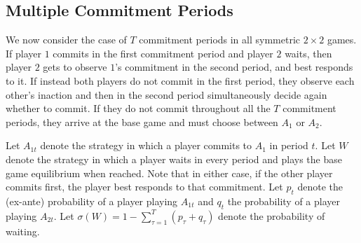 \documentclass[letterpaper]{article}
\newtheorem{corollary}{Corollary}
\theoremstyle{definition}
\begin{document}

\subsection{Multiple Commitment Periods}\label{sec:multiple-commitment-periods}
We now consider the case of $T$ commitment periods in all symmetric $2\times2$ games. If player $1$ commits in the first commitment period and player $2$ waits, then player $2$ gets to observe $1$'s commitment in the second period, and best responds to it.
If instead both players do not commit in the first period, they observe each other's inaction and then in the second period simultaneously decide again whether to commit. If they do not commit throughout all the $T$ commitment periods, they arrive at the base game and must choose between $A_1$ or $A_2$.

Let $A_{1t}$ denote the strategy in which a player commits to $A_1$ in period $t$. Let $W$ denote the strategy in which a player waits in every period and plays the base game equilibrium when reached. Note that in either case, if the other player commits first, the player best responds to that commitment.
Let $p_{t}$ denote the (ex-ante) probability of a player playing $A_{1t}$ and $q_t$ the probability of a player playing $A_{2t}$. Let $\sigma(W)=1-\sum_{\tau=1}^{T}(p_\tau+q_\tau)$ denote the probability of waiting.
\end{document}
